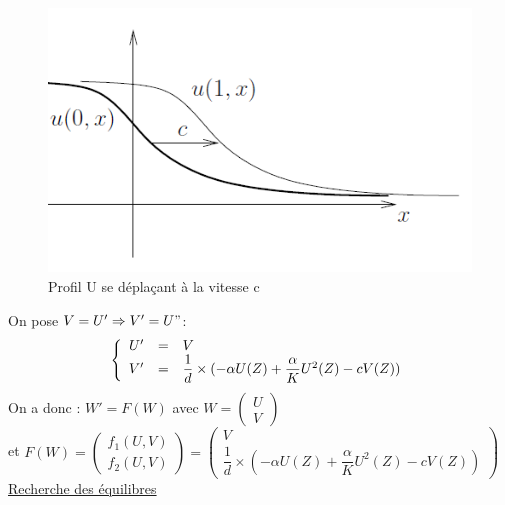 \documentclass[a4paper,11pt]{article}
\begin{document}
\begin{figure}[H]
	\centering
	\includegraphics[width=0.40\linewidth]{SimulationKPP/FrontOnde}\hfill
	\caption{Profil U se déplaçant à la vitesse c}
\end{figure}



On pose $V=U' \Rightarrow V'=U"$:
\[
\left\{
\begin{array}{r c l}
U' &=& V\\
V' &=& \dfrac{1}{d} \times (-\alpha U(Z) + \dfrac{\alpha}{K} U^2(Z)- c V(Z))
\end{array}
\right.
\]
On a donc : $W'=F(W)$ avec $W=\begin{pmatrix} U \\ V \end{pmatrix}$\\ et $F(W)=\begin{pmatrix} f_1(U,V) \\ f_2(U,V) \end{pmatrix}=\begin{pmatrix} V \\ \dfrac{1}{d} \times (-\alpha U(Z) + \dfrac{\alpha}{K} U^2(Z)- c V(Z)) \end{pmatrix}$
\newline
\newline
\underline{Recherche des équilibres}
\end{document}
